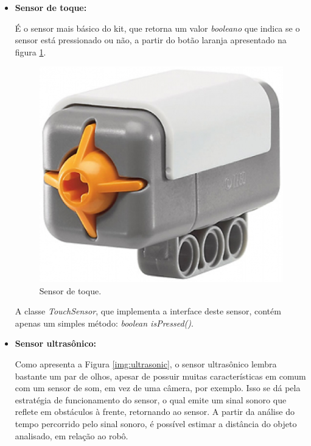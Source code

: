 		\begin{itemize}
			\item \textbf{Sensor de toque:}

				É o sensor mais básico do kit, que retorna um valor \textit{booleano} que indica se o sensor está pressionado ou não, a partir do botão laranja apresentado na figura \ref{img:sensorToque}.

				\begin{figure}[H]
					\centering
					\includegraphics[scale=0.2]{figuras/sensorToque.eps}
					\caption{Sensor de toque.}
					\label{img:sensorToque}
				\end{figure}

				A classe \textit{TouchSensor}, que implementa a interface deste sensor, contém apenas um simples método: \textit{boolean isPressed()}.

			\item \textbf{Sensor ultrasônico:}

				Como apresenta a Figura \ref{img:ultrasonic}, o sensor ultrasônico lembra bastante um par de olhos, apesar de possuir muitas características em comum com um sensor de som, em vez de uma câmera, por exemplo. Isso se dá pela estratégia de funcionamento do sensor, o qual emite um sinal sonoro que reflete em obstáculos à frente, retornando ao sensor. A partir da análise do tempo percorrido pelo sinal sonoro, é possível estimar a distância do objeto analisado, em relação ao robô.


\end{itemize}
